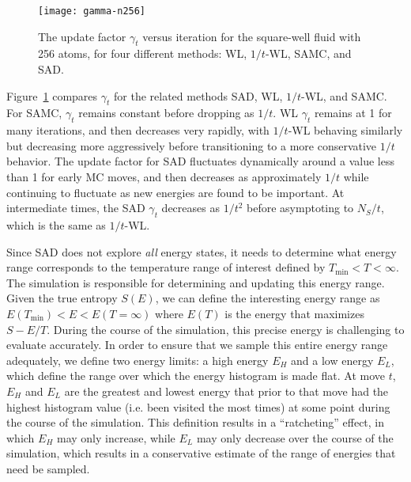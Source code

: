 \documentclass[letterpaper,twocolumn,amsmath,amssymb,pre,aps,10pt]{revtex4-1}
\begin{document}
\begin{figure}
  \texttt{[image: gamma-n256]}
  \caption{The update factor $\gamma_t$ versus iteration for the
    square-well fluid with 256 atoms, for four different methods: WL, $1/t$-WL, SAMC,
    and SAD.}
    \label{fig:gamma-vs-t}
\end{figure}
Figure~\ref{fig:gamma-vs-t} compares $\gamma_t$ for the related
methods SAD, WL, $1/t$-WL, and SAMC.  For SAMC, $\gamma_t$ remains
constant before dropping as $1/t$.  WL $\gamma_t$ remains at 1 for
many iterations, and then decreases very rapidly, with $1/t$-WL
behaving similarly but decreasing more aggressively before
transitioning to a more conservative $1/t$ behavior.  The update
factor for SAD fluctuates dynamically around a value less than 1 for
early MC moves, and then decreases as approximately $1/t$ while
continuing to fluctuate as new energies are found to be important.  At
intermediate times, the SAD $\gamma_t$ decreases as $1/t^2$ before
asymptoting to $N_S/t$, which is the same as $1/t$-WL.

Since SAD does not explore \emph{all} energy states, it needs to
determine what energy range corresponds to the temperature range of
interest defined by $T_{\min}<T<\infty$. The simulation is responsible
for determining and updating this energy range. Given the true entropy
$S(E)$, we can define the interesting energy range as
  $E(T_{\min}) <E< E(T=\infty)$
where $E(T)$ is the energy that maximizes $S-E/T$.  During the course of the
simulation, this precise energy is challenging to evaluate accurately.
In order to ensure that we sample this entire energy range adequately,
we define two energy limits:  a high energy $E_H$ and a low
energy $E_L$, which define the range over which the energy histogram
is made flat. At move $t$, $E_H$ and $E_L$ are the greatest and lowest
energy that prior to that move
had the highest histogram value (i.e. been visited the most times) at some point
during the course of the simulation.
This definition results in a ``ratcheting'' effect, in which $E_H$
may only increase, while $E_L$ may only decrease over the course of the
simulation, which results in a conservative estimate of the range of
energies that need be sampled.
\end{document}
